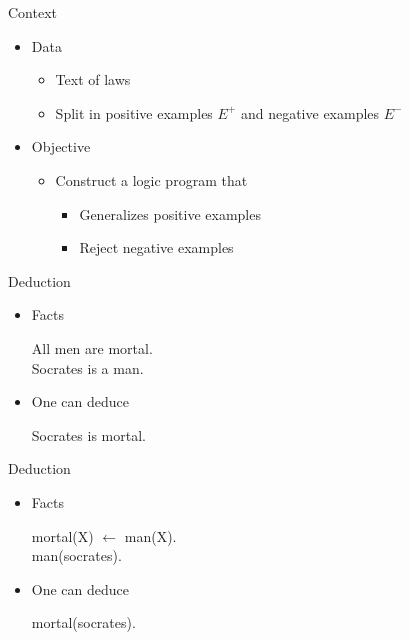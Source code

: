 
\begin{frame}{Context}
\vfill
\begin{itemize}
    \item Data
    \begin{itemize}
        \item Text of laws
        \item Split in positive examples $E^+$ and negative examples $E^-$
    \end{itemize}
    \vfill
    \item Objective
    \begin{itemize}
        \item Construct a logic program that
        \begin{itemize}
            \item Generalizes positive examples
            \item Reject negative examples
        \end{itemize}
    \end{itemize}
\end{itemize}
\vfill
\end{frame}



\begin{frame}{Deduction}
\vfill
\begin{itemize}
    \item Facts
    \begin{center}
        All men are mortal.\\
        Socrates is a man.
    \end{center}
    \vfill
    \item One can deduce
    \begin{center}
        Socrates is mortal.
    \end{center}
\end{itemize}
\vfill    
\end{frame}


\begin{frame}{Deduction}
\vfill
\begin{itemize}
    \item Facts
    \begin{center}
        mortal(X) $\leftarrow$ man(X).\\
        man(socrates).
    \end{center}
    \vfill
    \item One can deduce
    \begin{center}
        mortal(socrates).
    \end{center}
\end{itemize}
\vfill    
\end{frame}

